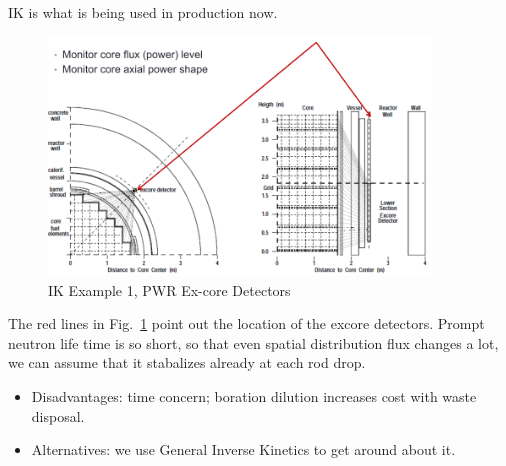 \documentclass{school-22.211-notes}
\begin{document}
\clearpage
{}
IK is what is being used in production now. 
\begin{figure}[ht]
  \centering
  \includegraphics[width=4in]{images/pke/ik-ex1.png}
  \caption{IK Example 1, PWR Ex-core Detectors} \label{ik-ex1}
\end{figure}
The red lines in Fig.~\ref{ik-ex1} point out the location of the excore detectors. Prompt neutron life time is so short, so that even spatial distribution flux changes a lot, we can assume that it stabalizes already at each rod drop. 
\begin{itemize}
\item Disadvantages: time concern; boration dilution increases cost with waste disposal.  
\item Alternatives: we use General Inverse Kinetics to get around about it. 
\end{itemize}
\end{document}
